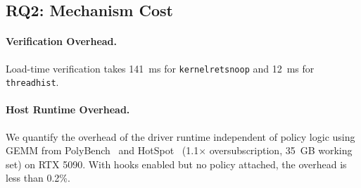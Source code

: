 \subsection{RQ2: Mechanism Cost}
\label{sec:rq2-cost}

\paragraph{Verification Overhead.}
Load-time verification takes 141~ms for \texttt{kernel\-ret\-snoop} and 12~ms for \texttt{thread\-hist}.

\paragraph{Host Runtime Overhead.}
We quantify the overhead of the \sys driver runtime independent of policy logic using GEMM from PolyBench~\cite{grauer2012auto} and HotSpot~\cite{che2009rodinia} (1.1$\times$ oversubscription, 35~GB working set) on RTX 5090.
With hooks enabled but no policy attached, the overhead is less than 0.2\%.

